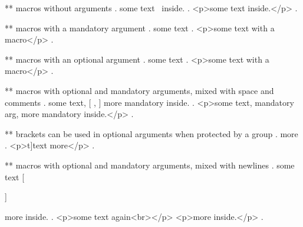 ** macros without arguments
.
some text \echo\ inside.
.
<p>some text  inside.</p>
.

** macros with a mandatory argument
.
some text 
.
<p>some text with a macro</p>
.

** macros with an optional argument
.
some text 
.
<p>some text with a macro</p>
.


** macros with optional and mandatory arguments, mixed with space and comments
.
some text,  [%
,  %
 ]
 {more mandatory} inside.
.
<p>some text, mandatory arg, more mandatory inside.</p>
.


** brackets can be used in optional arguments when protected by a group
.
\echo[{t]}t]{ext} more
.
<p>t]text more</p>
.



** macros with optional and mandatory arguments, mixed with newlines
.
some text  [ %

 ]%

  {more} inside.
.
<p>some text again<br></p>
<p>more inside.</p>
.
